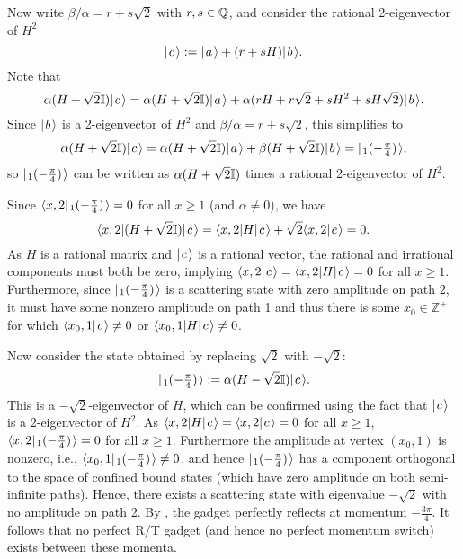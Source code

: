 \documentclass[../thesis-main/thesis-main]{subfiles}
\begin{document}
Now write $\beta/\alpha=r+s\sqrt{2}$ with $r,s\in\mathbb{Q}$, and consider the rational 2-eigenvector of $H^2$
\[
  |\mspace{2mu} c \mspace{2mu} \rangle := |\mspace{2mu} a \mspace{2mu} \rangle + (r+sH) |\mspace{2mu} b \mspace{2mu} \rangle.
\]
Note that
\[
  \alpha (H + \sqrt{2} \mathbb{I}) |\mspace{2mu} c \mspace{2mu} \rangle 
= \alpha(H+ \sqrt{2} \mathbb{I}) |\mspace{2mu} a \mspace{2mu} \rangle + \alpha (rH+r\sqrt{2}+ sH^2+sH\sqrt{2}) |\mspace{2mu} b \mspace{2mu} \rangle.
\]
Since $|\mspace{2mu} b \mspace{2mu} \rangle$ is a 2-eigenvector of $H^2$ and $\beta/\alpha=r+s\sqrt{2}$, this simplifies to
\begin{equation}
  \alpha (H + \sqrt{2}\mathbb{I}) |\mspace{2mu} c \mspace{2mu} \rangle 
  = \alpha (H + \sqrt{2}\mathbb{I}) |\mspace{2mu} a \mspace{2mu} \rangle + \beta(H + \sqrt{2}\mathbb{I}) |\mspace{2mu} b \mspace{2mu} \rangle 
  = |\mspace{2mu} \sc_1(-\tfrac{\pi}{4}) \mspace{2mu} \rangle, \label{eq:sc1_c}
\end{equation}
so $|\mspace{2mu} \sc_1(-\tfrac{\pi}{4}) \mspace{2mu} \rangle$ can be written as $\alpha(H+\sqrt{2}\mathbb{I})$ times a rational 2-eigenvector of $H^2$.

Since $\langle{x,2}|\mspace{2mu} \sc_1(-\tfrac{\pi}{4}) \mspace{2mu} \rangle = 0$ for all $x\geq 1$ (and $\alpha\neq 0$), we have
\[
  \langle{x,2}| (H+\sqrt{2}\mathbb{I}) |\mspace{2mu} c \mspace{2mu} \rangle 
  = \langle{x,2}| H |\mspace{2mu} c \mspace{2mu} \rangle + \sqrt{2} \langle{x,2}|\mspace{2mu} c \mspace{2mu} \rangle 
  = 0.
\]
As $H$ is a rational matrix and $|\mspace{2mu} c \mspace{2mu} \rangle$ is a rational vector, the rational and irrational components must both be zero, implying $\langle{x,2}|\mspace{2mu} c \mspace{2mu} \rangle  =\langle{x,2}|H|\mspace{2mu} c \mspace{2mu} \rangle = 0$ for all $x\geq 1$. Furthermore, since $ |\mspace{2mu} \sc_1(-\tfrac{\pi}{4}) \mspace{2mu} \rangle$ is a scattering state with zero amplitude on path $2$, it must have some nonzero amplitude on path 1 and thus there is some $x_0\in \mathbb{Z}^+$ for which $\langle{x_0,1}|\mspace{2mu} c \mspace{2mu} \rangle\neq 0$ or $\langle{x_0,1}|H|\mspace{2mu} c \mspace{2mu} \rangle \neq 0$.

Now consider the state obtained by replacing $\sqrt{2}$ with $-\sqrt{2}$:
\[
  |\mspace{2mu} \overline{\sc}_1(-\tfrac{\pi}{4}) \mspace{2mu} \rangle := \alpha (H-\sqrt{2}\mathbb{I}) |\mspace{2mu} c \mspace{2mu} \rangle.
\]
This is a $-\sqrt{2}$-eigenvector of $H$, which can be confirmed using the fact that $|\mspace{2mu} c \mspace{2mu} \rangle$ is a $2$-eigenvector of $H^2$. As $\langle{x,2} | H |\mspace{2mu} c \mspace{2mu} \rangle = \langle x,2 |\mspace{2mu} c \mspace{2mu} \rangle = 0$ for all $x\geq 1$, $\langle x,2 |\mspace{2mu} \overline{\sc}_1(-\tfrac{\pi}{4}) \mspace{2mu} \rangle = 0$ for all $x\geq 1$. Furthermore the amplitude at vertex $(x_0,1)$ is nonzero, i.e.,  $\langle x_0,1 |\mspace{2mu} \overline{\sc}_1(-\tfrac{\pi}{4}) \mspace{2mu} \rangle \neq 0$, and hence $|\mspace{2mu} \overline{\sc}_1(-\tfrac{\pi}{4}) \mspace{2mu} \rangle$ has a component orthogonal to the space of confined bound states (which have zero amplitude on both semi-infinite paths).  Hence, there exists a scattering state with eigenvalue $-\sqrt{2}$ with no amplitude on path 2. By , the gadget perfectly reflects at momentum $-\frac{3\pi}{4}$.  It follows that no perfect R/T gadget (and hence no perfect momentum switch) exists between these momenta.
\end{document}
